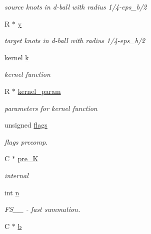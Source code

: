 \begin{DoxyCompactItemize}
\begin{DoxyCompactList}\small\item\em source knots in d-\/ball with radius 1/4-\/eps\-\_\-b/2 \end{DoxyCompactList}\item 
\hypertarget{structfastsum__plan___afb7359a87b751e11f5b77e58325cf697}{R $\ast$ \hyperlink{structfastsum__plan___afb7359a87b751e11f5b77e58325cf697}{y}}\label{structfastsum__plan___afb7359a87b751e11f5b77e58325cf697}

\begin{DoxyCompactList}\small\item\em target knots in d-\/ball with radius 1/4-\/eps\-\_\-b/2 \end{DoxyCompactList}\item 
\hypertarget{structfastsum__plan___aaf4ea39f8bed50a000d83eec53ee42b8}{kernel \hyperlink{structfastsum__plan___aaf4ea39f8bed50a000d83eec53ee42b8}{k}}\label{structfastsum__plan___aaf4ea39f8bed50a000d83eec53ee42b8}

\begin{DoxyCompactList}\small\item\em kernel function \end{DoxyCompactList}\item 
\hypertarget{structfastsum__plan___a2f57e2c602bdf72644590e90fc07264a}{R $\ast$ \hyperlink{structfastsum__plan___a2f57e2c602bdf72644590e90fc07264a}{kernel\-\_\-param}}\label{structfastsum__plan___a2f57e2c602bdf72644590e90fc07264a}

\begin{DoxyCompactList}\small\item\em parameters for kernel function \end{DoxyCompactList}\item 
unsigned \hyperlink{structfastsum__plan___ab8680533cc667f052c9c83275e0756fa}{flags}
\begin{DoxyCompactList}\small\item\em flags precomp. \end{DoxyCompactList}\item 
C $\ast$ \hyperlink{structfastsum__plan___abb4a9dc73722c3920d73bfaefd2affdf}{pre\-\_\-\-K}
\begin{DoxyCompactList}\small\item\em internal \end{DoxyCompactList}\item 
int \hyperlink{structfastsum__plan___a271a9a4e952484997e902c5cbd5ff084}{n}
\begin{DoxyCompactList}\small\item\em F\-S\-\_\-\-\_\- -\/ fast summation. \end{DoxyCompactList}\item 
\hypertarget{structfastsum__plan___a7a976db9b36131c4bea0ba2c90be9119}{C $\ast$ \hyperlink{structfastsum__plan___a7a976db9b36131c4bea0ba2c90be9119}{b}}\label{structfastsum__plan___a7a976db9b36131c4bea0ba2c90be9119}


\end{DoxyCompactItemize}
